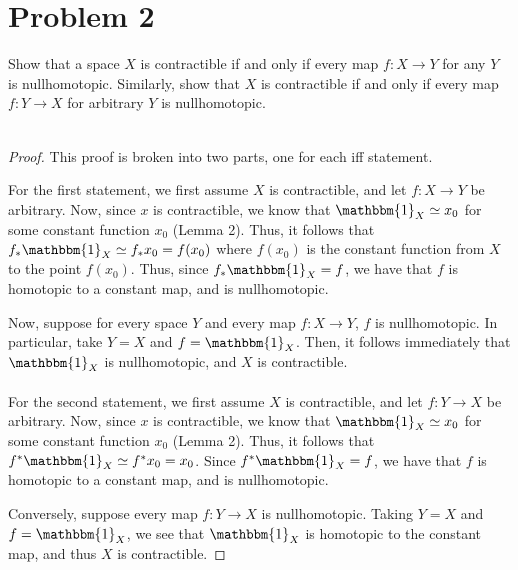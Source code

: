 \documentclass[fontsize=11pt]{scrartcl} %
\numberwithin{equation}{section} %
\numberwithin{figure}{section} %
\numberwithin{table}{section} %
\begin{document}
\section*{Problem 2} %
Show that a space $X$ is contractible if and only if every map $f:X\to Y$ for
any $Y$ is nullhomotopic. Similarly, show that $X$ is contractible if and only
if every map $f:Y\to X$ for arbitrary $Y$ is nullhomotopic.
\\
\\
\begin{proof}
    This proof is broken into two parts, one for each iff statement.

    For the first statement, we first assume $X$ is contractible, and let
    $f:X\to Y$ be arbitrary. Now, since $x$ is contractible, we know that
    $\mathbbm{1}_X\simeq x_0$ for some constant function $x_0$ (Lemma 2). 
    Thus, it follows that $f_*\mathbbm{1}_X\simeq f_*x_0 = f(x_0)$ where
    $f(x_0)$ is the constant function from $X$ to the point $f(x_0)$. Thus,
    since $f_*\mathbbm{1}_X = f$, we have that $f$ is homotopic to a constant
    map, and is nullhomotopic.

    Now, suppose for every space $Y$ and every map $f:X\to Y$, $f$ is
    nullhomotopic. In particular, take $Y=X$ and $f=\mathbbm{1}_X$. Then, it
    follows immediately that $\mathbbm{1}_X$ is nullhomotopic, and $X$ is
    contractible.
    \\
    \\
    For the second statement, we first assume $X$ is contractible, and let
    $f:Y\to X$ be arbitrary. Now, since $x$ is contractible, we know that
    $\mathbbm{1}_X\simeq x_0$ for some constant function $x_0$ (Lemma 2). 
    Thus, it follows that $f^*\mathbbm{1}_X\simeq f^*x_0 = x_0$.
    Since $f^*\mathbbm{1}_X = f$, we have that $f$ is homotopic to a constant
    map, and is nullhomotopic.

    Conversely, suppose every map $f:Y\to X$ is nullhomotopic. Taking $Y=X$ and
    $f = \mathbbm{1}_X$, we see that $\mathbbm{1}_X$ is homotopic to the
    constant map, and thus $X$ is contractible.
\end{proof}

\newpage
\end{document}
